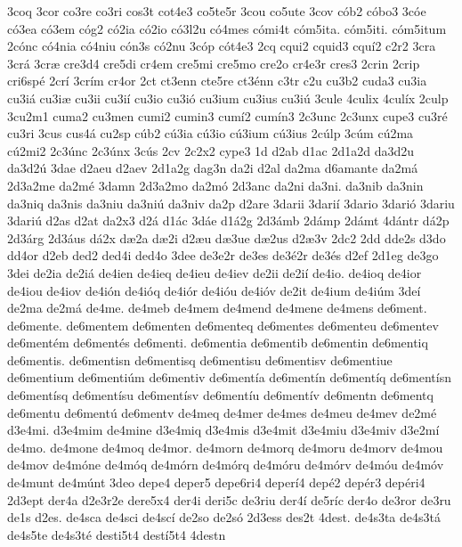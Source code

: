 {3coq
3cor
co3re
co3ri
cos3t
cot4e3
co5te5r
3cou
co5ute
3cov
c^^f3b2
c^^f3bo3
3c^^f3e
c^^f33ea
c^^f33em
c^^f3g2
c^^f32ia
c^^f32io
c^^f33l2u
c^^f34mes
c^^f3mi4t
c^^f3m5ita.
c^^f3m5iti.
c^^f3m5itum
2c^^f3nc
c^^f34nia
c^^f34niu
c^^f3n3s
c^^f32nu
3c^^f3p
c^^f3t4e3
2cq
cqui2
cquid3
cqu^^ed2
c2r2
3cra
3cr^^e1
3cr^^e6
cre3d4
cre5di
cr4em
cre5mi
cre5mo
cre2o
cr4e3r
cres3
2crin
2crip
cri6sp^^e9
2cr^^ed
3cr^^edm
cr4or
2ct
ct3enn
cte5re
ct3^^e9nn
c3tr
c2u
cu3b2
cuda3
cu3ia
cu3i^^e1
cu3i^^e6
cu3ii
cu3i^^ed
cu3io
cu3i^^f3
cu3ium
cu3ius
cu3i^^fa
3cule
4culix
4cul^^edx
2culp
3cu2m1
cuma2
cu3men
cumi2
cumin3
cum^^ed2
cum^^edn3
2c3unc
2c3unx
cupe3
cu3r^^e9
cu3ri
3cus
cus4^^e1
cu2sp
c^^fab2
c^^fa3ia
c^^fa3io
c^^fa3ium
c^^fa3ius
2c^^falp
3c^^fam
c^^fa2ma
c^^fa2mi2
2c3^^fanc
2c3^^fanx
3c^^fas
2cv
2c2x2
cype3
1d
d2ab
d1ac
2d1a2d
da3d2u
da3d2^^fa
3dae
d2aeu
d2aev
2d1a2g
dag3n
da2i
d2al
da2ma
d6amante
da2m^^e1
2d3a2me
da2m^^e9
3damn
2d3a2mo
da2m^^f3
2d3anc
da2ni
da3ni.
da3nib
da3nin
da3niq
da3nis
da3niu
da3ni^^fa
da3niv
da2p
d2are
3darii
3dari^^ed
3dario
3dari^^f3
3dariu
3dari^^fa
d2as
d2at
da2x3
d2^^e1
d1^^e1c
3d^^e1e
d1^^e12g
2d3^^e1mb
2d^^e1mp
2d^^e1mt
4d^^e1ntr
d^^e12p
2d3^^e1rg
2d3^^e1us
d^^e12x
d^^e62a
d^^e62i
d2^^e6u
d^^e63ue
d^^e62us
d2^^e63v
2dc2
2dd
dde2s
d3do
dd4or
d2eb
ded2
ded4i
ded4o
3dee
de3e2r
de3es
de3^^e92r
de3^^e9s
d2ef
2d1eg
de3go
3dei
de2ia
de2i^^e1
de4ien
de4ieq
de4ieu
de4iev
de2ii
de2i^^ed
de4io.
de4ioq
de4ior
de4iou
de4iov
de4i^^f3n
de4i^^f3q
de4i^^f3r
de4i^^f3u
de4i^^f3v
de2it
de4ium
de4i^^fam
3de^^ed
de2ma
de2m^^e1
de4me.
de4meb
de4mem
de4mend
de4mene
de4mens
de6ment.
de6mente.
de6mentem
de6menten
de6menteq
de6mentes
de6menteu
de6mentev
de6ment^^e9m
de6ment^^e9s
de6menti.
de6mentia
de6mentib
de6mentin
de6mentiq
de6mentis.
de6mentisn
de6mentisq
de6mentisu
de6mentisv
de6mentiue
de6mentium
de6menti^^fam
de6mentiv
de6ment^^eda
de6ment^^edn
de6ment^^edq
de6ment^^edsn
de6ment^^edsq
de6ment^^edsu
de6ment^^edsv
de6ment^^edu
de6ment^^edv
de6mentn
de6mentq
de6mentu
de6ment^^fa
de6mentv
de4meq
de4mer
de4mes
de4meu
de4mev
de2m^^e9
d3e4mi.
d3e4mim
de4mine
d3e4miq
d3e4mis
d3e4mit
d3e4miu
d3e4miv
d3e2m^^ed
de4mo.
de4mone
de4moq
de4mor.
de4morn
de4morq
de4moru
de4morv
de4mou
de4mov
de4m^^f3ne
de4m^^f3q
de4m^^f3rn
de4m^^f3rq
de4m^^f3ru
de4m^^f3rv
de4m^^f3u
de4m^^f3v
de4munt
de4m^^fant
3deo
depe4
deper5
depe6ri4
deper^^ed4
dep^^e92
dep^^e9r3
dep^^e9ri4
2d3ept
der4a
d2e3r2e
dere5x4
der4i
deri5c
de3riu
der4^^ed
de5r^^edc
der4o
de3ror
de3ru
de1s
d2es.
de4sca
de4sci
de4sc^^ed
de2so
de2s^^f3
2d3ess
des2t
4dest.
de4s3ta
de4s3t^^e1
de4s5te
de4s3t^^e9
desti5t4
dest^^ed5t4
4destn
}
